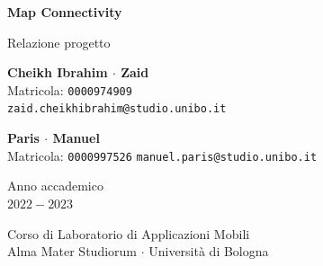 \documentclass[11pt]{article}
\begin{document}
\begin{titlepage}
    \begin{center}
        \vspace*{3.0cm}
            
        \Huge
        \textbf{Map Connectivity}
            
        \vspace{0.3cm}
        \LARGE
        Relazione progetto

        \vspace{1.5cm}
          
        \begin{minipage}[t]{0.47\textwidth}
            \begin{center}
                {\large{\bf Cheikh Ibrahim $\cdot$ Zaid}}\\
                {\large Matricola: \texttt{0000974909}} \\
                {\large{\texttt{zaid.cheikhibrahim@studio.unibo.it}}}
            \end{center}
    
            \end{minipage}
            \hfill
            \begin{minipage}[t]{0.47\textwidth}\raggedleft
            \begin{center}
                {\large{\bf Paris $\cdot$ Manuel}}\\
                {\large Matricola: \texttt{0000997526}}
                {\large{\texttt{manuel.paris@studio.unibo.it}}}
            \end{center}
        \end{minipage}
            
        \vspace{6cm}
            
        Anno accademico\\
        $2022 - 2023$
            
        \vspace{0.8cm}
            
            
        \Large
        Corso di Laboratorio di Applicazioni Mobili\\
        Alma Mater Studiorum $\cdot$ Università di Bologna\\
            
    \end{center}
\end{titlepage}
\pagebreak
\tableofcontents
\pagebreak
\end{document}
